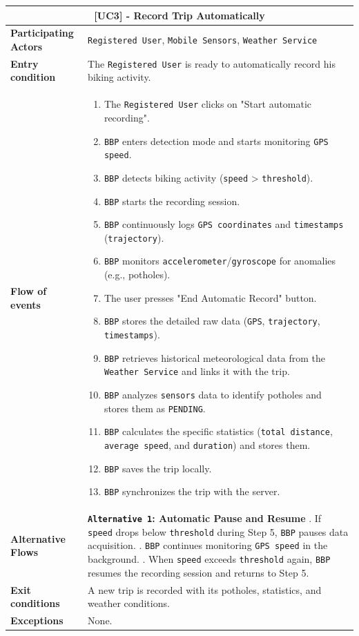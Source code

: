 \begin{table}[H]
\centering
\begin{tabularx}{\textwidth}{|l|X|}
\hline
\multicolumn{2}{|c|}{\textbf{[UC3] - Record Trip Automatically}} \\ \hline
\textbf{Participating Actors} & \texttt{Registered User}, \texttt{Mobile Sensors}, \texttt{Weather Service} \\ \hline
\textbf{Entry condition}      & The \texttt{Registered User} is ready to automatically record his biking activity. \\ \hline
\textbf{Flow of events}       & 
\begin{enumerate}
    \item The \texttt{Registered User} clicks on "Start automatic recording".
    \item \texttt{BBP} enters detection mode and starts monitoring \texttt{GPS speed}.
    \item \texttt{BBP} detects biking activity (\texttt{speed} > \texttt{threshold}).
    \item \texttt{BBP} starts the recording session.
    \item \texttt{BBP} continuously logs \texttt{GPS coordinates} and \texttt{timestamps} (\texttt{trajectory}).
    \item \texttt{BBP} monitors \texttt{accelerometer}/\texttt{gyroscope} for anomalies (e.g., potholes).
    \item The user presses "End Automatic Record" button.
    \item \texttt{BBP} stores the detailed raw data (\texttt{GPS}, \texttt{trajectory}, \texttt{timestamps}).
    \item \texttt{BBP} retrieves historical meteorological data from the \texttt{Weather Service} and links it with the trip.
    \item \texttt{BBP} analyzes \texttt{sensors} data to identify potholes and stores them as \texttt{PENDING}.
    \item \texttt{BBP} calculates the specific statistics (\texttt{total distance}, \texttt{average speed}, and \texttt{duration}) and stores them.
    \item \texttt{BBP} saves the trip locally.
    \item \texttt{BBP} synchronizes the trip with the server.
\end{enumerate} \\ \hline
\textbf{Alternative Flows}    & 
\textbf{\texttt{Alternative 1}: Automatic Pause and Resume} \newline
1. If \texttt{speed} drops below \texttt{threshold} during Step 5, \texttt{BBP} pauses data acquisition. \newline
2. \texttt{BBP} continues monitoring \texttt{GPS speed} in the background. \newline
3. When \texttt{speed} exceeds \texttt{threshold} again, \texttt{BBP} resumes the recording session and returns to Step 5. \\ \hline
\textbf{Exit conditions}      & A new trip is recorded with its potholes, statistics, and weather conditions. \\ \hline
\textbf{Exceptions} & None. \\ \hline


\end{tabularx}
\end{table}

